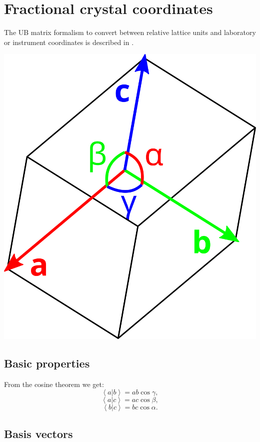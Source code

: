 %
%

\section{Fractional crystal coordinates}

The UB matrix formalism to convert between relative lattice units and laboratory or instrument coordinates is described in \cite{Lumsden2005}.


\begin{center}
	\includegraphics[width = 0.2 \textwidth]{figures/cell}
\end{center}

\subsection*{Basic properties}

From the cosine theorem we get:
\begin{equation} \left< a | b \right > = ab \cos \gamma, \label{ab} \end{equation}
\begin{equation} \left< a | c \right > = ac \cos \beta, \label{ac} \end{equation}
\begin{equation} \left< b | c \right > = bc \cos \alpha. \label{bc} \end{equation}



\subsection*{Basis vectors}

